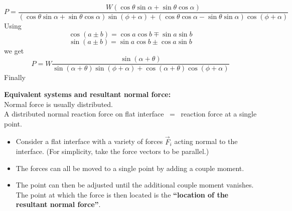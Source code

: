 \documentclass{seminar}
\begin{document}
\begin{slide}
{\small $$
P=  \frac{  W(\cos\theta\sin\alpha + \sin\theta\cos\alpha) } {
(\cos\theta\sin\alpha + \sin\theta\cos\alpha) \sin(\phi+\alpha)+
(\cos\theta\cos\alpha -\sin\theta \sin\alpha) \cos(\phi + \alpha)  }
$$}
Using
$$
\cos(a\pm b)=\cos a\cos b \mp \sin a \sin b
$$
$$
\sin(a\pm b)=\sin a \cos b \pm \cos a \sin b
$$
we get
$$
P=  W\frac{  \sin(\alpha+\theta) } { \sin(\alpha+\theta)
\sin(\phi+\alpha)+ \cos(\alpha+\theta)\cos(\phi + \alpha)  }
$$
Finally\\
 \vfill
\end{slide}



















\begin{slide}
{\bf\blue Equivalent systems and resultant normal force:}\\
Normal force is usually distributed.\\
 A distributed normal reaction force on
flat interface $~=~$ reaction force at a single point.
\begin{itemize}
\item{}Consider a flat interface with a variety of forces $\vec F_i$
acting normal to the interface. (For simplicity, take the force
vectors to be parallel.)
\item{}The forces can all be moved to a single point by adding a couple moment.
\item{}The point can then be adjusted until the additional couple
moment vanishes. The point at which the force is then located is the
{\bf \red ``location of the resultant normal force''}.
\end{itemize}
\vfill
\end{slide}
\end{document}
